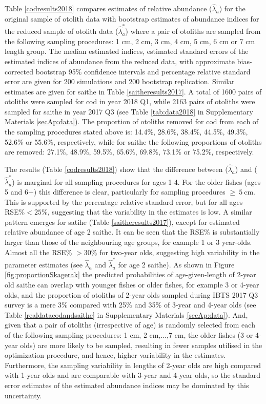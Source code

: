 \documentclass[a4paper 12pt]{article}
\numberwithin{equation}{section}
\begin{document}
 Table \ref{codresults2018} compares estimates of relative  abundance ($\hat{\lambda}_{a}$) for the original sample of otolith data  with  bootstrap estimates of abundance indices  for the reduced sample of otolith data  ($\hat{\lambda}_{a}^{*}$) where a pair of otoliths are sampled from the following sampling procedures: 1 cm, 2 cm, 3 cm, 4 cm, 5 cm, 6 cm or 7 cm length group. The median estimated indices, estimated standard errors of the estimated indices of abundance from the reduced data, with  approximate bias-corrected bootstrap 95\% confidence intervals and percentage relative standard error are given for  $200$ simulations and $200$ bootstrap replication. Similar estimates are given for saithe in Table \ref{saitheresults2017}. A total of 1600 pairs of otoliths were sampled for cod in year 2018 Q1, while 2163 pairs of otoliths were sampled for saithe in year 2017 Q3 (see Table \ref{tab:data2018} in Supplementary Materials \ref{secAp:data}). The proportion of otoliths removed for cod from each of the sampling  procedures stated above is: 14.4\%, 28.6\%, 38.4\%, 44.5\%, 49.3\%, 52.6\% or 55.6\%, respectively, while for saithe the following proportions of otoliths are removed: 27.1\%, 48.9\%, 59.5\%, 65.6\%, 69.8\%, 73.1\% or 75.2\%, respectively.
  
 The results (Table \ref{codresults2018}) show that the difference between  ($\hat{\lambda}_{a}$) and ($\hat{\lambda}_{a}^{*}$) is marginal for all sampling procedures for ages 1-4. For the older fishes (ages 5 and 6+) this difference is clear, particularly for sampling procedures $\ge \ 5 \ \mathrm{cm}$. This is supported by the percentage relative standard error, but for all ages RSE\%$< 25\%$, suggesting that the variability in the estimates is low. A similar pattern emerges for satihe (Table \ref{saitheresults2017}), except for estimated relative abundance of age 2 saithe. It can be seen that the RSE\% is substantially larger than those of the neighbouring age groups, for example 1 or 3 year-olds. Almost all the RSE\% $>30\%$ for two-year olds, suggesting high variability in the parameter estimates (see $\hat{\lambda}_{a}$ and $\hat{\lambda}_{a}^{*}$ for age 2 saithe).  As shown in Figure \ref{fig:proportionSkagerak} the predicted probabilities of age-given-length of 2-year old saithe can overlap with younger fishes or older fishes, for example 3 or 4-year olds, and the proportion of otoliths of 2-year olds sampled during IBTS 2017 Q3 survey is a mere 3\% compared with 25\% and 35\% of 3-year and 4-year olds (see Table \ref{realdatacodandsaithe} in Supplementary Materials \ref{secAp:data}). And, given that a pair of otoliths (irrespective of age) is randomly selected from each of the following sampling procedures: 1 cm, 2 cm,...,7 cm, the older fishes (3 or 4-year olds) are more likely to be sampled, resulting in fewer samples utilised in the optimization procedure, and hence, higher variability in the estimates. Furthermore, the sampling variability in lengths of 2-year olds are high compared with 1-year olds and are comparable with 3-year and 4-year olds, so the standard error estimates of the estimated abundance indices may be dominated by this uncertainty. 
\end{document}

